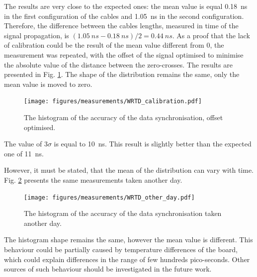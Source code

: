     
    The results are very close to the expected ones: the mean value is equal 0.18~ns in the first configuration of the cables and 1.05~ns in the second configuration. Therefore, the difference between the cables lengths, measured in time of the signal propagation, is $ (1.05\:ns - 0.18\:ns)/2 = 0.44\:ns$. 
    As a proof that the lack of calibration could be the result of the mean value different from 0, the measurement was repeated, with the offset of the signal optimised to minimise the absolute value of the distance between the zero-crosses. The results are presented in Fig. \ref{fig:meas:wrtd_calib}. The shape of the distribution remains the same, only the mean value is moved to zero. 
    
    \begin{figure}
    	\centerline{\texttt{[image: figures/measurements/WRTD\_calibration.pdf]}}
        	\caption{The histogram of the accuracy of the data synchronisation, offset optimised.}
            \label{fig:meas:wrtd_calib}
    \end{figure}
    
    The value of 3$\sigma$ is equal to 10~ns. This result is slightly better than the expected one of 11~ns. 


    However, it must be stated, that the mean of the distribution can vary with time. Fig. \ref{fig:meas:wrtd_other_day} presents the same measurements taken another day. 
    \begin{figure}
    	\centerline{\texttt{[image: figures/measurements/WRTD\_other\_day.pdf]}}
        	\caption{The histogram of the accuracy of the data synchronisation taken another day.}
            \label{fig:meas:wrtd_other_day}
    \end{figure}
    The histogram shape remains the same, however the mean value is different. This behaviour could be partially caused by temperature differences of the board, which could explain differences in the range of few hundreds pico-seconds. Other sources of such behaviour should be investigated in the future work.